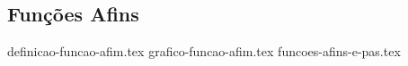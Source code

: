 \subsection{Funções Afins}

{definicao-funcao-afim.tex}
{grafico-funcao-afim.tex}
{funcoes-afins-e-pas.tex}